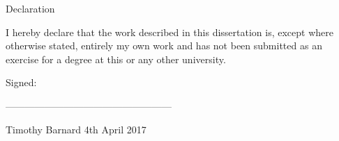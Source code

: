\cleardoublepage

\begin{Declaration}
Declaration


I hereby declare that the work described in this dissertation is, except where otherwise stated, entirely my own work and has not been submitted as an exercise for a degree at this or any other university.


Signed:

---------------------------------------------------

Timothy Barnard
4th April 2017

\end{Declaration}